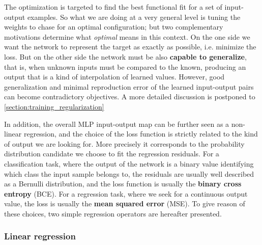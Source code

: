 The optimization is targeted to find the best functional fit for a set of input-output examples. So what we are doing at a very general level is tuning the weights to chase for an optimal configuration; but two complementary motivations determine what \textit{optimal} means in this context. On the one side we want the network to represent the target as exactly as possible, i.e. minimize the loss. But on the other side the network must be also \textbf{capable to generalize}, that is, when unknown inputs must be compared to the known, producing an output that is a kind of interpolation of learned values. However, good generalization and minimal reproduction error of the learned input-output pairs can become contradictory objectives.
A more detailed discussion is postponed to \cref{section:training_regularization}

In addition, the overall \acs{MLP} input-output map can be further seen as a non-linear regression, and the choice of the loss function is strictly related to the kind of output we are looking for. More precisely it corresponds to the probability distribution candidate we choose to fit the regression residuals. For a classification task, where the output of the network is a binary value identifying which class the input sample belongs to, the residuals are usually well described as a Bernulli distribution, and the loss function is usually the \textbf{binary cross entropy} (BCE). For a regression task, where we seek for a continuous output value, the loss is usually the \textbf{mean squared error} (MSE).
%
To give reason of these choices, two simple regression operators are hereafter presented.

\subsubsection{Linear regression}

